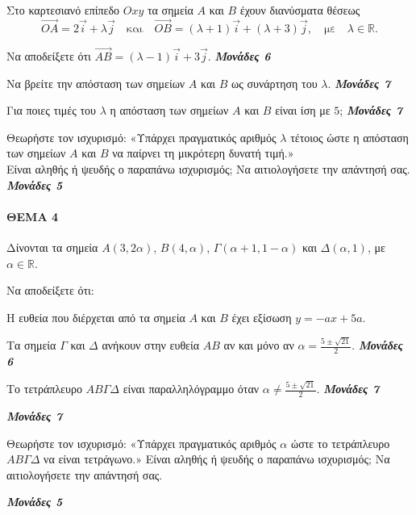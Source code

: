 \documentclass[11pt,a4paper,twoside]{book}
\newcommand{\monades}[1]{
\hspace*{\fill}
\textbf{\textit{\textcolor{maincolor}{Μονάδες #1}}}}
\begin{document}
\vspace{4mm}


Στο καρτεσιανό επίπεδο $Oxy$ τα σημεία $A$ και $B$ έχουν διανύσματα θέσεως
\[ \vec{OA} = 2\vec{i} + \lambda\vec{j} \quad \text{και} \quad \vec{OB} = (\lambda + 1)\vec{i} + (\lambda + 3)\vec{j}, \quad \text{με} \quad \lambda \in \mathbb{R}. \]

\begin{alist}    \item Να αποδείξετε ότι $\vec{AB} = (\lambda - 1)\vec{i} + 3\vec{j}$. \monades{6}
    \item Να βρείτε την απόσταση των σημείων $A$ και $B$ ως συνάρτηση του $\lambda$. \monades{7}
    \item Για ποιες τιμές του $\lambda$ η απόσταση των σημείων $A$ και $B$ είναι ίση με $5$; \monades{7}
    \item Θεωρήστε τον ισχυρισμό: «Υπάρχει πραγματικός αριθμός $\lambda$ τέτοιος ώστε η απόσταση των σημείων $A$ και $B$ να παίρνει τη μικρότερη δυνατή τιμή.»\\
 Είναι αληθής ή ψευδής ο παραπάνω ισχυρισμός; Να αιτιολογήσετε την απάντησή σας. \monades{5}\end{alist}

\vspace{4mm}

\paragraph{ΘΕΜΑ 4}
Δίνονται τα σημεία $A(3, 2\alpha)$, $B(4,\alpha)$, $\Gamma(\alpha + 1, 1 - \alpha)$ και $\Delta(\alpha, 1)$, με $\alpha \in \mathbb{R}$.

\begin{alist}
    \item Να αποδείξετε ότι:
    \begin{rlist}        \item Η ευθεία που διέρχεται από τα σημεία $A$ και $B$ έχει εξίσωση $y = -ax + 5a$.
        \item Τα σημεία $\Gamma$ και $\Delta$ ανήκουν στην ευθεία $AB$ αν και μόνο αν $\alpha = \frac{5\pm\sqrt{21}}{2}$.  \monades{6}
        \item Το τετράπλευρο $AB\Gamma\Delta$ είναι παραλληλόγραμμο όταν $\alpha \ne \frac{5\pm\sqrt{21}}{2}$.  \monades{7}
 \monades{7}\end{rlist}
    \item Θεωρήστε τον ισχυρισμό: «Υπάρχει πραγματικός αριθμός $\alpha$ ώστε το τετράπλευρο $AB\Gamma\Delta$ να είναι τετράγωνο.» Είναι αληθής ή ψευδής ο παραπάνω ισχυρισμός; Να αιτιολογήσετε την απάντησή σας.
    \monades{5}
\end{alist}
\end{document}
